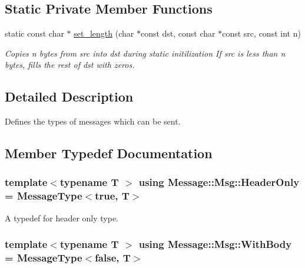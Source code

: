\subsection*{Static Private Member Functions}
\begin{DoxyCompactItemize}
\item 
static const char $\ast$ \hyperlink{class_message_1_1_msg_adacbbaadf7d1f920e837d07d3dd39725}{set\-\_\-length} (char $\ast$const dst, const char $\ast$const src, const int n)
\begin{DoxyCompactList}\small\item\em Copies n bytes from src into dst during static initilization If src is less than n bytes, fills the rest of dst with zeros. \end{DoxyCompactList}\end{DoxyCompactItemize}


\subsection{Detailed Description}
Defines the types of messages which can be sent. 

\subsection{Member Typedef Documentation}
\hypertarget{class_message_1_1_msg_a56cc5b2c5d898b85e97b1f3a46ab3999}{
\subsubsection[{Header\-Only}]{\setlength{\rightskip}{0pt plus 5cm}template$<$typename T $>$ using {\bf Message\-::\-Msg\-::\-Header\-Only} =  {\bf Message\-Type}$<$true, T$>$}}\label{class_message_1_1_msg_a56cc5b2c5d898b85e97b1f3a46ab3999}


A typedef for header only type. 

\hypertarget{class_message_1_1_msg_a385691f2f7fc10f0b4c1544b8892a6c9}{
\subsubsection[{With\-Body}]{\setlength{\rightskip}{0pt plus 5cm}template$<$typename T $>$ using {\bf Message\-::\-Msg\-::\-With\-Body} =  {\bf Message\-Type}$<$false, T$>$}}\label{class_message_1_1_msg_a385691f2f7fc10f0b4c1544b8892a6c9}


